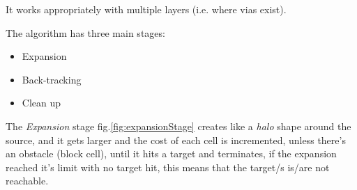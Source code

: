     It works appropriately with multiple layers (i.e. where vias exist).

    The algorithm has three main stages:
    \begin{itemize}
        \item Expansion
        \item Back-tracking
        \item Clean up
    \end{itemize}

    The \textit{Expansion} stage fig.\ref{fig:expansionStage} creates like a \textit{halo} shape around the source,
    and it gets larger and the cost of each cell is incremented,
    unless there's an obstacle (block cell),
    until it hits a target and terminates,
    if the expansion reached it's limit with no target hit, this means that the target/s is/are not
    reachable.
